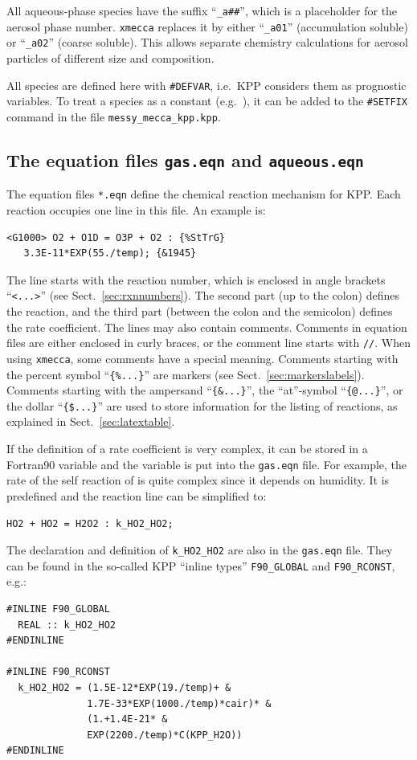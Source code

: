 \documentclass[twoside]{article}
\begin{document}
All aqueous-phase species have the suffix ``\verb|_a##|'', which is a
placeholder for the aerosol phase number. \verb|xmecca| replaces it by
either ``\verb|_a01|'' (accumulation soluble) or ``\verb|_a02|'' (coarse
soluble). This allows separate chemistry calculations for aerosol
particles of different size and composition.

All species are defined here with \verb|#DEFVAR|, i.e.\ KPP considers
them as prognostic variables. To treat a species as a constant (e.g.\ 
), it can be added to the \verb|#SETFIX| command in the file
\verb|messy_mecca_kpp.kpp|.

\subsection{The equation files {\tt gas.eqn} and {\tt aqueous.eqn}}
\label{sec:eqnfiles}

The equation files \verb|*.eqn| define the chemical reaction mechanism
for KPP. Each reaction occupies one line in this file. An example is:

\begin{verbatim}
<G1000> O2 + O1D = O3P + O2 : {%StTrG}
   3.3E-11*EXP(55./temp); {&1945}
\end{verbatim}

The line starts with the reaction number, which is enclosed in angle
brackets ``\verb|<...>|'' (see Sect.~\ref{sec:rxnnumbers}). The second
part (up to the colon) defines the reaction, and the third part (between
the colon and the semicolon) defines the rate coefficient. The lines may
also contain comments. Comments in equation files are either enclosed in
curly braces, or the comment line starts with \verb|//|. When using
\verb|xmecca|, some comments have a special meaning. Comments starting
with the percent symbol ``\verb|{%...}|''
  are markers (see Sect.~\ref{sec:markerslabels}). Comments starting
  with the ampersand ``\verb|{&...}|'', the ``at''-symbol
  ``\verb|{@...}|'', or the dollar ``\verb|{$...}|'' are used to store
  information for the listing of reactions, as explained in
  Sect.~\ref{sec:latextable}.

If the definition of a rate coefficient is very complex, it can be
stored in a Fortran90 variable and the variable is put into the
\verb|gas.eqn| file. For example, the rate of the self reaction of
\chem{HO_2} is quite complex since it depends on humidity. It is
predefined and the reaction line can be simplified to:
\begin{verbatim}
HO2 + HO2 = H2O2 : k_HO2_HO2;
\end{verbatim}
The declaration and definition of \verb|k_HO2_HO2| are also in the
\verb|gas.eqn| file. They can be found in the so-called KPP ``inline
types'' \verb|F90_GLOBAL| and \verb|F90_RCONST|, e.g.:
\begin{verbatim}
#INLINE F90_GLOBAL
  REAL :: k_HO2_HO2
#ENDINLINE

#INLINE F90_RCONST
  k_HO2_HO2 = (1.5E-12*EXP(19./temp)+ &
              1.7E-33*EXP(1000./temp)*cair)* &
              (1.+1.4E-21* &
              EXP(2200./temp)*C(KPP_H2O))
#ENDINLINE
\end{verbatim}
\end{document}
